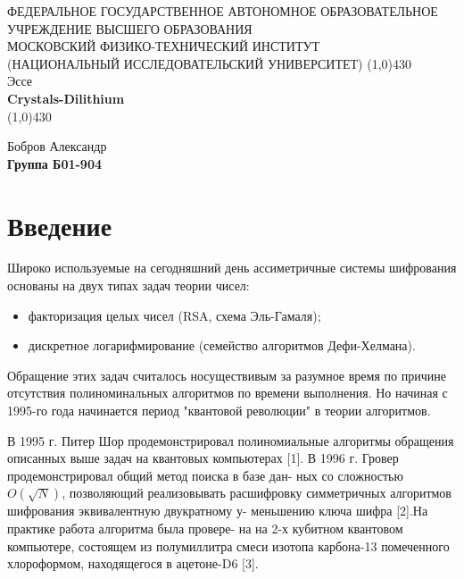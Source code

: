 \documentclass{article}
\begin{document}
	\begin{titlepage}
		\begin{center}
			\large{\small ФЕДЕРАЛЬНОЕ ГОСУДАРСТВЕННОЕ АВТОНОМНОЕ ОБРАЗОВАТЕЛЬНОЕ\\ УЧРЕЖДЕНИЕ ВЫСШЕГО ОБРАЗОВАНИЯ\\ МОСКОВСКИЙ ФИЗИКО-ТЕХНИЧЕСКИЙ ИНСТИТУТ\\ (НАЦИОНАЛЬНЫЙ ИССЛЕДОВАТЕЛЬСКИЙ УНИВЕРСИТЕТ)}
			\vfill
			\line(1,0){430}\\[1mm]
			\huge{Эссе}\\
			\huge\textbf{Crystals-Dilithium}\\
			\line(1,0){430}\\[1mm]
			\vfill
			\begin{flushright}
				\normalsize{Бобров Александр}\\
				\normalsize{\textbf{Группа Б01-904}}\\
			\end{flushright}
		\end{center}
	\end{titlepage}
	\section{
			Введение
	}

	Широко используемые на сегодняшний день ассиметричные системы шифрования основаны на двух типах задач теории чисел:
	\begin{itemize}
		\item факторизация целых чисел (RSA, схема Эль-Гамаля);
		\item дискретное логарифмирование (семейство алгоритмов Дефи-Хелмана).
	\end{itemize}

	Обращение этих задач считалось носуществивым за разумное время по причине отсутствия полиноминальных алгоритмов по времени выполнения. Но начиная с 1995-го года начинается период "квантовой революции" в теории алгоритмов.
	
	В 1995 г. Питер Шор продемонстрировал полиномиальные алгоритмы
	обращения описанных выше задач на квантовых компьютерах [1]. В 1996 г. Гровер продемонстрировал общий метод поиска в базе дан-
	ных со сложностью $O(\sqrt{N})$, позволяющий реализовывать расшифровку
	симметричных алгоритмов шифрования эквивалентную двукратному у-
	меньшению ключа шифра [2].На практике работа алгоритма была провере-
	на на 2-х кубитном квантовом компьютере, состоящем из полумиллитра
	смеси изотопа карбона-13 помеченного хлороформом, находящегося в ацетоне-D6 [3].
	
\end{document}
